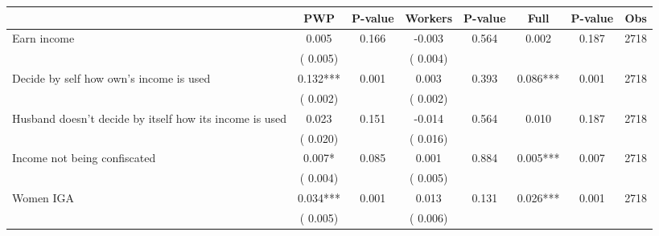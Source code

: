 
\begin{tabular}{l*{7}{c}}\hline&\multicolumn{1}{c}{PWP}&\multicolumn{1}{c}{P-value}&\multicolumn{1}{c}{Workers}&\multicolumn{1}{c}{P-value}&\multicolumn{1}{c}{Full}&\multicolumn{1}{c}{P-value}&\multicolumn{1}{c}{Obs} \\ \hline

 Earn income       &              0.005       &        0.166  &             -0.003       &        0.564  &              0.002       &              0.187 &  2718 \\ 
                       &       (       0.005)             &                               &       (       0.004)                     &                               &                                               &                                &                      \\ 

 Decide by self how own's income is used       &              0.132***       &        0.001  &              0.003       &        0.393  &              0.086***       &              0.001 &  2718 \\ 
                       &       (       0.002)             &                               &       (       0.002)                     &                               &                                               &                                &                      \\ 

 Husband doesn't decide by itself how its income is used       &              0.023       &        0.151  &             -0.014       &        0.564  &              0.010       &              0.187 &  2718 \\ 
                       &       (       0.020)             &                               &       (       0.016)                     &                               &                                               &                                &                      \\ 

 Income not being confiscated       &              0.007*       &        0.085  &              0.001       &        0.884  &              0.005***       &              0.007 &  2718 \\ 
                       &       (       0.004)             &                               &       (       0.005)                     &                               &                                               &                                &                      \\ 

 Women IGA       &              0.034***       &        0.001  &              0.013       &        0.131  &              0.026***       &              0.001 &  2718 \\ 
                       &       (       0.005)             &                               &       (       0.006)                     &                               &                                               &                                &                      \\ 

\hline \end{tabular}